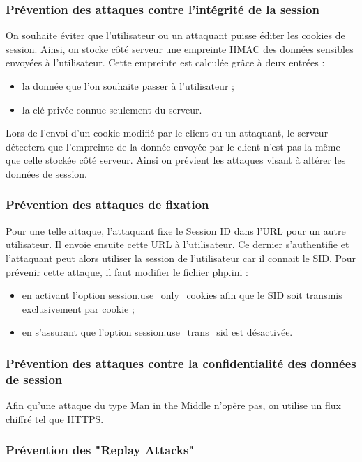 \documentclass[a4paper]{article}
\begin{document}
 		\subsubsection{Prévention des attaques contre l'intégrité de la session}
 		
On souhaite éviter que l'utilisateur ou un attaquant puisse éditer les cookies de session.
Ainsi, on stocke côté serveur une empreinte HMAC des données sensibles envoyées à l'utilisateur.
Cette empreinte est calculée grâce à deux entrées :
\begin{itemize}
	\item la donnée que l'on souhaite passer à l'utilisateur ;
	\item la clé privée connue seulement du serveur.
\end{itemize}
Lors de l'envoi d'un cookie modifié par le client ou un attaquant, le serveur détectera que l'empreinte
de la donnée envoyée par le client n'est pas la même que celle stockée côté serveur.
Ainsi on prévient les attaques visant à altérer les données de session.

		\subsubsection{Prévention des attaques de fixation}
		
Pour une telle attaque, l'attaquant fixe le Session ID dans l'URL pour un autre utilisateur.
Il envoie ensuite cette URL à l'utilisateur. Ce dernier s'authentifie et l'attaquant peut alors
utiliser la session de l'utilisateur car il connait le SID.
Pour prévenir cette attaque, il faut modifier le fichier php.ini :
\begin{itemize}
	\item en activant l'option session.use\_only\_cookies afin que le SID soit transmis exclusivement par cookie ;
	\item en s'assurant que l'option session.use\_trans\_sid est désactivée.
\end{itemize}
	
		\subsubsection{Prévention des attaques contre la confidentialité des données de session}
		
Afin qu'une attaque du type Man in the Middle n'opère pas, on utilise un flux chiffré tel que HTTPS.

		\subsubsection{Prévention des "Replay Attacks"}
\end{document}
